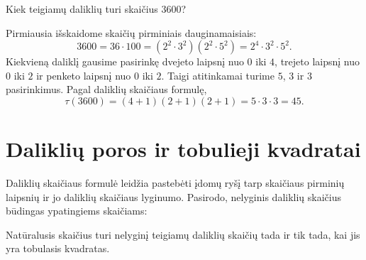 \documentclass[11pt,a4paper]{scrartcl}
\begin{document}
\begin{example}
Kiek teigiamų daliklių turi skaičius $3600$?
\end{example}
\begin{solution}
Pirmiausia išskaidome skaičių pirminiais dauginamaisiais:
\[
    3600=36\cdot100=(2^2\cdot3^2)(2^2\cdot5^2)=2^4\cdot3^2\cdot5^2.
\]
Kiekvieną daliklį gausime pasirinkę dvejeto laipsnį nuo $0$ iki $4$, trejeto laipsnį nuo $0$ iki $2$ ir penketo laipsnį nuo $0$ iki $2$. Taigi atitinkamai turime $5$, $3$ ir $3$ pasirinkimus. Pagal daliklių skaičiaus formulę,
\[
    \tau(3600)=(4+1)(2+1)(2+1)=5\cdot3\cdot3=45.
\]
\end{solution}

\section{Daliklių poros ir tobulieji kvadratai}

Daliklių skaičiaus formulė leidžia pastebėti įdomų ryšį tarp skaičiaus pirminių laipsnių ir jo daliklių skaičiaus lyginumo. Pasirodo, nelyginis daliklių skaičius būdingas ypatingiems skaičiams:

\begin{proposition}
Natūralusis skaičius turi nelyginį teigiamų daliklių skaičių tada ir tik tada, kai jis yra tobulasis kvadratas.
\end{proposition}
\end{document}
